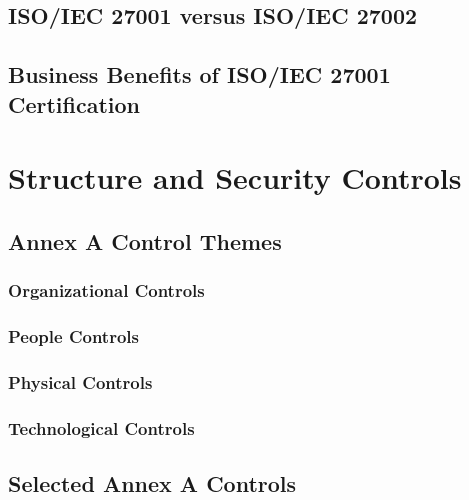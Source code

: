 
\subsection{ISO/IEC 27001 versus ISO/IEC 27002}


\subsection{Business Benefits of ISO/IEC 27001 Certification}


\section{Structure and Security Controls}


\subsection{Annex A Control Themes}

\subsubsection{Organizational Controls}

\subsubsection{People Controls}

\subsubsection{Physical Controls}

\subsubsection{Technological Controls}


\subsection{Selected Annex A Controls}

